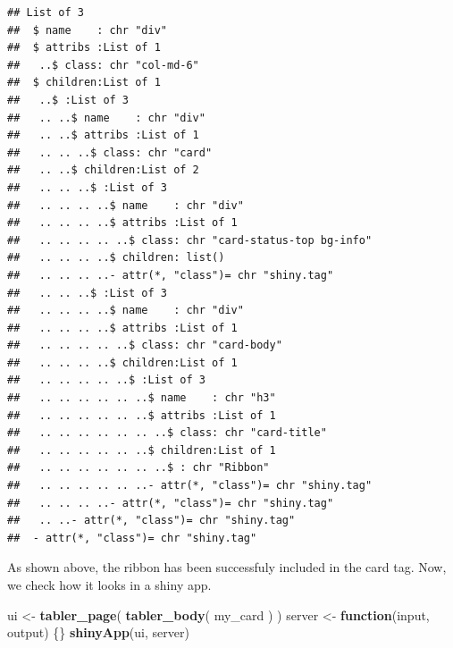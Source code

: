 \documentclass[
]{book}
\newenvironment{Shaded}{\begin{snugshade}}{\end{snugshade}}
\newcommand{\ControlFlowTok}[1]{\textcolor[rgb]{0.13,0.29,0.53}{\textbf{#1}}}
\newcommand{\DataTypeTok}[1]{\textcolor[rgb]{0.13,0.29,0.53}{#1}}
\newcommand{\DecValTok}[1]{\textcolor[rgb]{0.00,0.00,0.81}{#1}}
\newcommand{\KeywordTok}[1]{\textcolor[rgb]{0.13,0.29,0.53}{\textbf{#1}}}
\newcommand{\NormalTok}[1]{#1}
\newcommand{\OperatorTok}[1]{\textcolor[rgb]{0.81,0.36,0.00}{\textbf{#1}}}
\newcommand{\OtherTok}[1]{\textcolor[rgb]{0.56,0.35,0.01}{#1}}
\newcommand{\StringTok}[1]{\textcolor[rgb]{0.31,0.60,0.02}{#1}}
\begin{document}
\begin{verbatim}
## List of 3
##  $ name    : chr "div"
##  $ attribs :List of 1
##   ..$ class: chr "col-md-6"
##  $ children:List of 1
##   ..$ :List of 3
##   .. ..$ name    : chr "div"
##   .. ..$ attribs :List of 1
##   .. .. ..$ class: chr "card"
##   .. ..$ children:List of 2
##   .. .. ..$ :List of 3
##   .. .. .. ..$ name    : chr "div"
##   .. .. .. ..$ attribs :List of 1
##   .. .. .. .. ..$ class: chr "card-status-top bg-info"
##   .. .. .. ..$ children: list()
##   .. .. .. ..- attr(*, "class")= chr "shiny.tag"
##   .. .. ..$ :List of 3
##   .. .. .. ..$ name    : chr "div"
##   .. .. .. ..$ attribs :List of 1
##   .. .. .. .. ..$ class: chr "card-body"
##   .. .. .. ..$ children:List of 1
##   .. .. .. .. ..$ :List of 3
##   .. .. .. .. .. ..$ name    : chr "h3"
##   .. .. .. .. .. ..$ attribs :List of 1
##   .. .. .. .. .. .. ..$ class: chr "card-title"
##   .. .. .. .. .. ..$ children:List of 1
##   .. .. .. .. .. .. ..$ : chr "Ribbon"
##   .. .. .. .. .. ..- attr(*, "class")= chr "shiny.tag"
##   .. .. .. ..- attr(*, "class")= chr "shiny.tag"
##   .. ..- attr(*, "class")= chr "shiny.tag"
##  - attr(*, "class")= chr "shiny.tag"
\end{verbatim}

\begin{Shaded}
\end{Shaded}

As shown above, the ribbon has been successfuly included in the card tag. Now, we check how it looks in a shiny app.

\begin{Shaded}
\begin{Highlighting}[]
\NormalTok{ui <-}\StringTok{ }\KeywordTok{tabler_page}\NormalTok{(}
  \KeywordTok{tabler_body}\NormalTok{(}
\NormalTok{    my_card}
\NormalTok{  )}
\NormalTok{)}
\NormalTok{server <-}\StringTok{ }\ControlFlowTok{function}\NormalTok{(input, output) \{\}}
\KeywordTok{shinyApp}\NormalTok{(ui, server)}
\end{Highlighting}
\end{Shaded}
\end{document}
